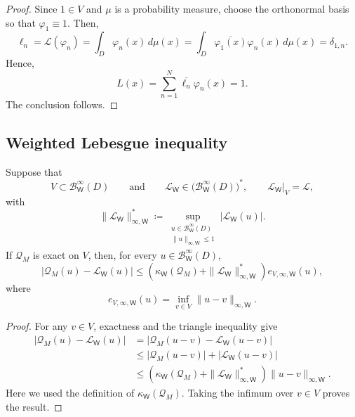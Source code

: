 \documentclass[10pt,dvipsnames]{amsart}
\begin{document}
\begin{proof}
Since \(1\in V\) and \(\mu\) is a probability measure, choose the
orthonormal basis so that \(\varphi_1\equiv1\).  Then,
\[
    \ell_n
    =
    \mathcal L(\varphi_n)
    =
    \int_D \varphi_n(x)\,d\mu(x)
    =
    \int_D \overline{\varphi_1(x)}\varphi_n(x)\,d\mu(x)
    =
    \delta_{1,n}.
\]
Hence,
\[
    L(x)
    =
    \sum_{n=1}^N \overline{\ell_n}\varphi_n(x)
    =
    1.
\]
The conclusion follows.
\end{proof}

\subsection{Weighted Lebesgue inequality}
\label{app:lebesgue}

\begin{lemma} 
\label{lemma:lebesgue} 
Suppose that
\[
V\subset \mathcal{B}^\infty_{\mathsf W}(D)
\qquad\text{and}\qquad
\mathcal L_{\mathsf W}\in \bigl(\mathcal{B}^\infty_{\mathsf W}(D)\bigr)^*,
\qquad
\mathcal L_{\mathsf W}|_V=\mathcal L,
\]
with
\[
\|\mathcal L_{\mathsf W}\|_{\infty,\mathsf W}^*
\coloneqq
\sup_{\substack{u\in \mathcal{B}^\infty_{\mathsf W}(D)\\ \|u\|_{\infty,\mathsf W}\leq1}}
|\mathcal L_{\mathsf W}(u)|.
\]
If \(\mathcal Q_M\) is exact on \(V\), then, for every \(u\in \mathcal{B}^\infty_{\mathsf W}(D)\), 
\[ 
|\mathcal Q_M(u)-\mathcal L_{\mathsf W}(u)| \leq \left( \kappa_{\mathsf W}(\mathcal Q_M) + \|\mathcal L_{\mathsf W}\|_{\infty,\mathsf W}^* \right) e_{V,\infty,\mathsf W}(u),
\] 
where 
\[ 
e_{V,\infty,\mathsf W}(u) = \inf_{v\in V} \|u-v\|_{\infty,\mathsf W}. 
\] 
\end{lemma} 
\begin{proof} 
For any \(v\in V\), exactness and the triangle inequality give 
\[ 
\begin{aligned} 
    |\mathcal Q_M(u)-\mathcal L_{\mathsf W}(u)| &= |\mathcal Q_M(u-v)-\mathcal L_{\mathsf W}(u-v)| \\
    &\leq |\mathcal Q_M(u-v)| + |\mathcal L_{\mathsf W}(u-v)| \\
    &\leq \left( \kappa_{\mathsf W}(\mathcal Q_M) + \|\mathcal L_{\mathsf W}\|_{\infty,\mathsf W}^* \right) \|u-v\|_{\infty,\mathsf W}.
\end{aligned} 
\] 
Here we used the definition of \(\kappa_{\mathsf W}(\mathcal Q_M)\). Taking the infimum over \(v\in V\) proves the result. 
\end{proof}
\end{document}
